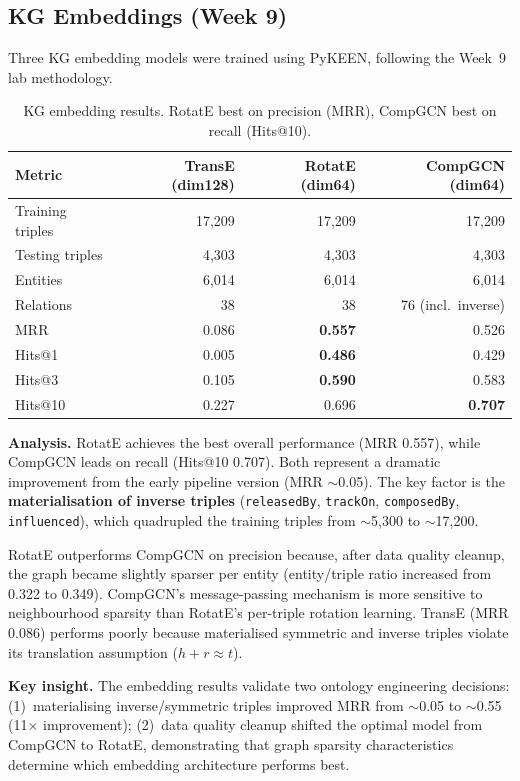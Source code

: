 \documentclass[11pt,a4paper]{article}
\begin{document}
\subsection{KG Embeddings (Week 9)}

Three KG embedding models were trained using PyKEEN, following the Week~9 lab methodology.

\begin{table}[h]
\centering
\begin{tabular}{lrrr}
\toprule
\textbf{Metric} & \textbf{TransE (dim128)} & \textbf{RotatE (dim64)} & \textbf{CompGCN (dim64)} \\
\midrule
Training triples & 17,209 & 17,209 & 17,209 \\
Testing triples & 4,303 & 4,303 & 4,303 \\
Entities & 6,014 & 6,014 & 6,014 \\
Relations & 38 & 38 & 76 (incl.\ inverse) \\
MRR & 0.086 & \textbf{0.557} & 0.526 \\
Hits@1 & 0.005 & \textbf{0.486} & 0.429 \\
Hits@3 & 0.105 & \textbf{0.590} & 0.583 \\
Hits@10 & 0.227 & 0.696 & \textbf{0.707} \\
\bottomrule
\end{tabular}
\caption{KG embedding results. RotatE best on precision (MRR), CompGCN best on recall (Hits@10).}
\end{table}

\textbf{Analysis.} RotatE achieves the best overall performance (MRR 0.557), while CompGCN leads on recall (Hits@10 0.707). Both represent a dramatic improvement from the early pipeline version (MRR $\sim$0.05). The key factor is the \textbf{materialisation of inverse triples} (\texttt{releasedBy}, \texttt{trackOn}, \texttt{composedBy}, \texttt{influenced}), which quadrupled the training triples from $\sim$5,300 to $\sim$17,200.

RotatE outperforms CompGCN on precision because, after data quality cleanup, the graph became slightly sparser per entity (entity/triple ratio increased from 0.322 to 0.349). CompGCN's message-passing mechanism is more sensitive to neighbourhood sparsity than RotatE's per-triple rotation learning. TransE (MRR 0.086) performs poorly because materialised symmetric and inverse triples violate its translation assumption ($h + r \approx t$).

\textbf{Key insight.} The embedding results validate two ontology engineering decisions: (1)~materialising inverse/symmetric triples improved MRR from $\sim$0.05 to $\sim$0.55 (11$\times$ improvement); (2)~data quality cleanup shifted the optimal model from CompGCN to RotatE, demonstrating that graph sparsity characteristics determine which embedding architecture performs best.
\end{document}
